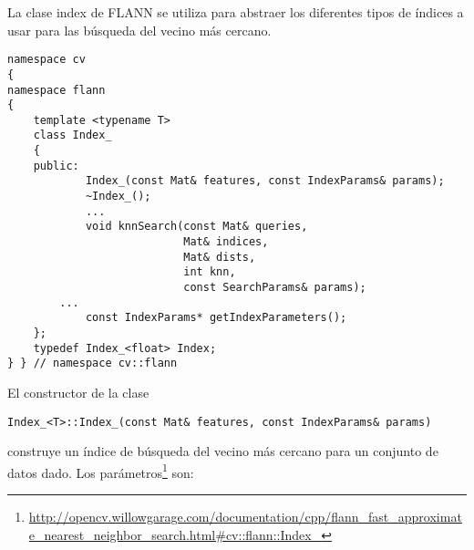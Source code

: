 La clase index de FLANN se utiliza para abstraer los diferentes tipos de índices a usar para las búsqueda del vecino más cercano.
\begin{lstlisting}
namespace cv
{
namespace flann
{
    template <typename T>
    class Index_
    {
    public:
            Index_(const Mat& features, const IndexParams& params);
            ~Index_();
            ...
            void knnSearch(const Mat& queries,
                           Mat& indices,
                           Mat& dists,
                           int knn,
                           const SearchParams& params);
	    ...
            const IndexParams* getIndexParameters();
    };
    typedef Index_<float> Index;
} } // namespace cv::flann
\end{lstlisting}
El constructor de la clase
\begin{lstlisting}
Index_<T>::Index_(const Mat& features, const IndexParams& params)
\end{lstlisting}
construye un índice de búsqueda del vecino más cercano para un conjunto de datos dado. Los parámetros\footnote{\url{http://opencv.willowgarage.com/documentation/cpp/flann_fast_approximate_nearest_neighbor_search.html\#cv::flann::Index_} }
son:
